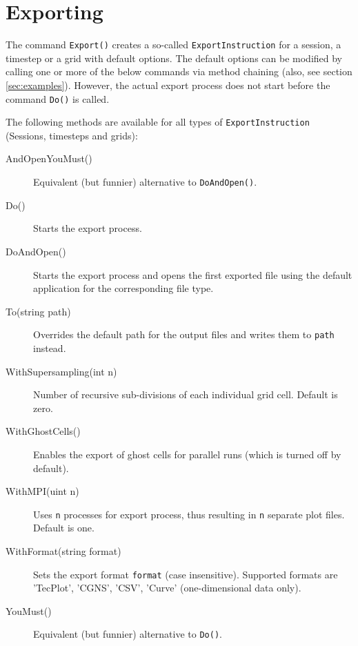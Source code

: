 \section{Exporting}
\label{sec:exporting}

The command \lstinline{Export()} creates a so-called \lstinline{ExportInstruction} for a session, a timestep or a grid with default options. The default options can be modified by calling one or more of the below commands via method chaining (also, see section \ref{sec:examples}). However, the actual export process does not start before the command \lstinline{Do()} is called.

The following methods are available for all types of \lstinline{ExportInstruction} (Sessions, timesteps and grids):
\begin{description}
	\item[AndOpenYouMust()]
	Equivalent (but funnier) alternative to \lstinline{DoAndOpen()}.
	
	\item[Do()]
	Starts the export process.
	
	\item[DoAndOpen()]
	Starts the export process and opens the first exported file using the default application for the corresponding file type.
	
	\item[To(string path)]
	Overrides the default path for the output files and writes them to \lstinline{path} instead.
	
	\item[WithSupersampling(int n)]
	Number of recursive sub-divisions of each individual grid cell. Default is zero.
	
	\item[WithGhostCells()]
	Enables the export of ghost cells for parallel runs (which is turned off by default).
	
	\item[WithMPI(uint n)]
	Uses \lstinline{n} processes for export process, thus resulting in \lstinline{n} separate plot files. Default is one.
	
	\item[WithFormat(string format)]
	Sets the export format \lstinline{format} (case insensitive). Supported formats are 'TecPlot', 'CGNS', 'CSV', 'Curve' (one-dimensional data only).
	
	\item[YouMust()]
	Equivalent (but funnier) alternative to \lstinline{Do()}.
\end{description}

